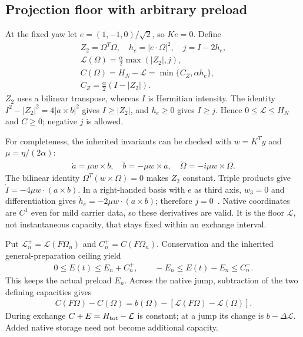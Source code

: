 \subsection{Projection floor with arbitrary preload}\label{sec:floor}
At the fixed yaw let $e=(1,-1,0)/\sqrt2$, so $Ke=0$. Define
\begin{equation}\label{eq:a18}%
\begin{gathered}
Z_2=\Omega^T\Omega,\quad h_e=|e\cdot\Omega|^2,\quad j=I-2h_e,\\ \mathcal L(\Omega)=\frac\alpha2\max(|Z_2|,j),\\ C(\Omega)=H_N-\mathcal L=\min\{C_Z,\alpha h_e\},\\ C_Z=\frac\alpha2(I-|Z_2|).
\end{gathered}
\end{equation}
$Z_2$ uses a bilinear transpose, whereas $I$ is Hermitian intensity. The identity $I^2-|Z_2|^2=4|a\times b|^2$ gives $I\ge|Z_2|$, and $h_e\ge0$ gives $I\ge j$. Hence $0\le\mathcal L\le H_N$ and $C\ge0$; negative $j$ is allowed.

For completeness, the inherited invariants can be checked with $w=K^Ty$ and $\mu=\eta/(2\alpha)$:
\begin{equation}\label{eq:a19}%
\begin{gathered}
\dot a=\mu w\times b,\quad\dot b=-\mu w\times a,\quad
\dot\Omega=-i\mu w\times\Omega.
\end{gathered}
\end{equation}
The bilinear identity $\Omega^T(w\times\Omega)=0$ makes $Z_2$ constant.
Triple products give $\dot I=-4\mu w\cdot(a\times b)$. In a right-handed basis with $e$ as third axis, $w_3=0$ and differentiation gives $\dot h_e=-2\mu w\cdot(a\times b)$; therefore $\dot j=0$~\cite[Theorem 3.1]{pc}. Native coordinates are $C^1$ even for mild carrier data, so these derivatives are valid. It is the floor $\mathcal L$, not instantaneous capacity, that stays fixed within an exchange interval.

Put $\mathcal L_n^+=\mathcal L(F\Omega_n)$ and $C_n^+=C(F\Omega_n)$. Conservation and the inherited general-preparation ceiling yield
\begin{equation}\label{eq:a20}%
\begin{gathered}
0\le E(t)\le E_n+C_n^+,\qquad
-E_n\le E(t)-E_n\le C_n^+ .
\end{gathered}
\end{equation}
This keeps the actual preload $E_n$. Across the native jump, subtraction of the two defining capacities gives
\begin{equation}\label{eq:a21}%
\begin{gathered}
C(F\Omega)-C(\Omega)=b(\Omega)-[\mathcal L(F\Omega)-\mathcal L(\Omega)].
\end{gathered}
\end{equation}
During exchange $C+E=H_{\rm tot}-\mathcal L$ is constant; at a jump its change is $b-\Delta\mathcal L$. Added native storage need not become additional capacity.

